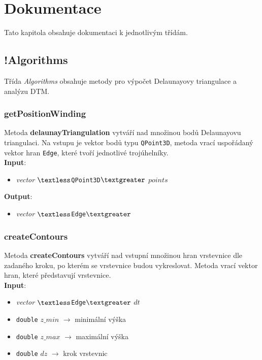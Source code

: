 \documentclass[a4paper, 12pt]{article}
\begin{document}
 
\section{Dokumentace}
Tato kapitola obsahuje dokumentaci k jednotlivým třídám.

\subsection{!Algorithms}
Třída \textit{Algorithms} obsahuje metody pro výpočet Delaunayovy triangulace a analýzu DTM.

\subsubsection*{getPositionWinding}
Metoda \textbf{delaunayTriangulation} vytváří nad množinou bodů Delaunayovu triangulaci. Na vstupu je vektor bodů typu \texttt{QPoint3D}, metoda vrací uspořádaný vektor hran \texttt{Edge}, které tvoří jednotlivé trojúhelníky.\\

\textbf{Input}:
\begin{itemize}
\item \textsl{vector} $\textless$\texttt{QPoint3D}$\textgreater$ $points$
\end{itemize}

\textbf{Output}:
\begin{itemize}
\item \textsl{vector} $\textless$\texttt{Edge}$\textgreater$
\end{itemize}

\subsubsection*{createContours}
Metoda \textbf{createContours} vytváří nad vstupní množinou hran vrstevnice dle zadaného kroku, po kterém se vrstevnice budou vykreslovat.  Metoda vrací vektor hran, které před\-sta\-vu\-jí vrstevnice.\\

\textbf{Input}:
\begin{itemize}
\item \textsl{vector} $\textless$\texttt{Edge}$\textgreater$ $dt$
\item \texttt{double} $z\_min$ $\rightarrow$ minimální výška
\item \texttt{double} $z\_max$ $\rightarrow$ maximální výška
\item \texttt{double} $dz$ $\rightarrow$ krok vrstevnic
\end{itemize}
\end{document}

